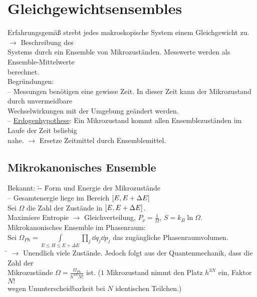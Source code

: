 \section{Gleichgewichtsensembles}
\begin{tabbing}
Erfahrungsgemäß strebt jedes makroskopische System einem Gleichgewicht zu. $\rightarrow$ Beschreibung des\\ Systems durch ein Ensemble von Mikrozuständen. Messwerte werden als Ensemble-Mittelwerte\\ berechnet.\\
Begründungen:\\
-- \=Messungen benötigen eine gewisse Zeit. In dieser Zeit kann der Mikrozustand durch unvermeidbare\\\> Wechselwirkungen mit der Umgebung geändert werden.\\
-- \= \uline{Erdogenhypothese}: Ein Mikrozustand kommt allen Ensemblezuständen im Laufe der Zeit beliebig\\\> nahe. $\rightarrow$ Ersetze Zeitmittel durch Ensemblemittel.
\end{tabbing}

\subsection{Mikrokanonisches Ensemble}
\label{sec:Mikrokanonisch}
\begin{tabbing}
Bekannt: \= -- \= Form und Energie der Mikrozustände\\
\> -- \> Gesamtenergie liege im Bereich $\left[ E,E+\Delta E \right]$\\
Sei $\Omega$ die Zahl der Zustände in $\left[ E,E+\Delta E \right]$.\\
Maximiere Entropie $\rightarrow$ Gleichverteilung, $P_\nu = \frac{1}{\Omega}$, $S=k_B \ln\Omega$.\\
Mikrokanonisches Ensemble im Phasenraum:\\
Sei $\Omega_{Ph} = \int\limits_{E\leq H\leq E+\Delta E} \prod\limits_j \dd{q}_j\dd{p}_j$ das zugängliche Phasenraumvolumen.\\
\hspace{4em} \= \kill
$\rightarrow$\> Unendlich viele Zustände. Jedoch folgt aus der Quantenmechanik, dass die Zahl der\\\> Mikrozustände $\Omega = \frac{\Omega_{Ph}}{h^{3N}N!}$ ist. ($1$ Mikrozustand \glqq nimmt den Platz $h^{3N}$ ein\grqq, Faktor $N!$\\\> wegen Ununterscheidbarkeit bei $N$ identischen Teilchen.)
\end{tabbing}

